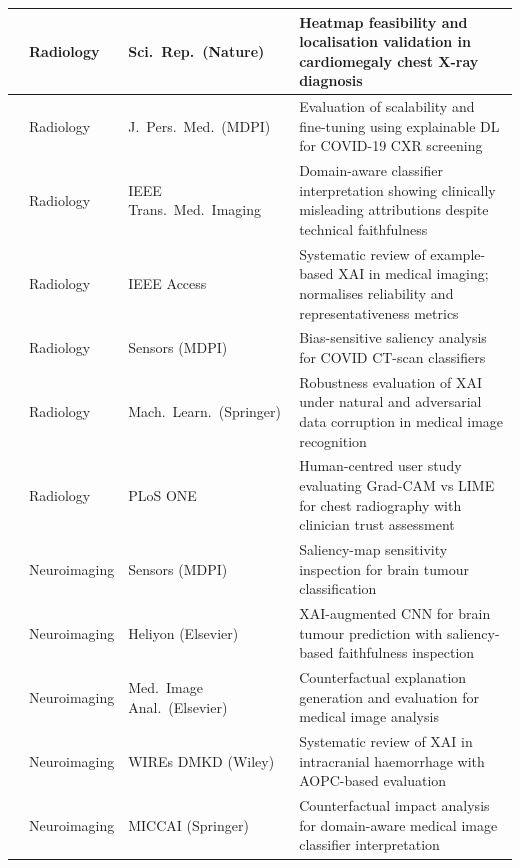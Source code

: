 \begin{longtable}{|p{3cm}|p{2.5cm}|p{3cm}|p{5.5cm}|}

\cite{Lee2021Cardiomegaly} & Radiology & Sci.\ Rep.\ (Nature) & Heatmap feasibility and localisation validation in cardiomegaly chest X-ray diagnosis \\
\hline
\cite{lee2020evaluation} & Radiology & J.\ Pers.\ Med.\ (MDPI) & Evaluation of scalability and fine-tuning using explainable DL for COVID-19 CXR screening \\
\hline
\cite{10051650} & Radiology & IEEE Trans.\ Med.\ Imaging & Domain-aware classifier interpretation showing clinically misleading attributions despite technical faithfulness \\
\hline
\cite{10440088} & Radiology & IEEE Access & Systematic review of example-based XAI in medical imaging; normalises reliability and representativeness metrics \\
\hline
\cite{palatnik2021xai} & Radiology & Sensors (MDPI) & Bias-sensitive saliency analysis for COVID CT-scan classifiers \\
\hline
\cite{Repetto2025EvaluatingTR} & Radiology & Mach.\ Learn.\ (Springer) & Robustness evaluation of XAI under natural and adversarial data corruption in medical image recognition \\
\hline
\cite{IhongbeFouad2024} & Radiology & PLoS ONE & Human-centred user study evaluating Grad-CAM vs LIME for chest radiography with clinician trust assessment \\
\hline


\cite{Chmiel2023} & Neuroimaging & Sensors (MDPI) & Saliency-map sensitivity inspection for brain tumour classification \\
\hline
\cite{Nazir2024UtilizingCC} & Neuroimaging & Heliyon (Elsevier) & XAI-augmented CNN for brain tumour prediction with saliency-based faithfulness inspection \\
\hline
\cite{singla2023explaining} & Neuroimaging & Med.\ Image Anal.\ (Elsevier) & Counterfactual explanation generation and evaluation for medical image analysis \\
\hline
\cite{Kohan2025} & Neuroimaging & WIREs DMKD (Wiley) & Systematic review of XAI in intracranial haemorrhage with AOPC-based evaluation \\
\hline
\cite{lenis2020domain} & Neuroimaging & MICCAI (Springer) & Counterfactual impact analysis for domain-aware medical image classifier interpretation \\
\hline


\end{longtable}
